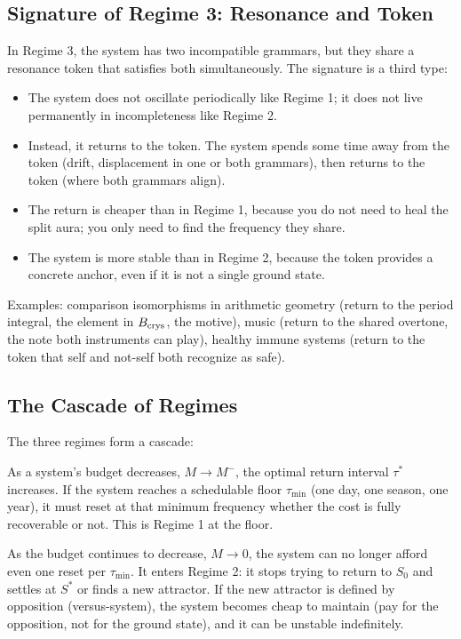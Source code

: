 \documentclass[12pt]{article}
\theoremstyle{definition}
\theoremstyle{remark}
\begin{document}
\subsection{Signature of Regime 3: Resonance and Token}

In Regime 3, the system has two incompatible grammars, but they share a resonance token that satisfies both simultaneously. The signature is a third type:

\begin{itemize}
\item The system does not oscillate periodically like Regime 1; it does not live permanently in incompleteness like Regime 2.
\item Instead, it returns to the token. The system spends some time away from the token (drift, displacement in one or both grammars), then returns to the token (where both grammars align).
\item The return is cheaper than in Regime 1, because you do not need to heal the split aura; you only need to find the frequency they share.
\item The system is more stable than in Regime 2, because the token provides a concrete anchor, even if it is not a single ground state.
\end{itemize}

Examples: comparison isomorphisms in arithmetic geometry (return to the period integral, the element in $B_{\rm crys}$, the motive), music (return to the shared overtone, the note both instruments can play), healthy immune systems (return to the token that self and not-self both recognize as safe).

\subsection{The Cascade of Regimes}

The three regimes form a cascade:

As a system's budget decreases, $M\to M^-$, the optimal return interval $\tau^*$ increases. If the system reaches a schedulable floor $\tau_{\min}$ (one day, one season, one year), it must reset at that minimum frequency whether the cost is fully recoverable or not. This is Regime 1 at the floor.

As the budget continues to decrease, $M\to 0$, the system can no longer afford even one reset per $\tau_{\min}$. It enters Regime 2: it stops trying to return to $S_0$ and settles at $S^*$ or finds a new attractor. If the new attractor is defined by opposition (versus-system), the system becomes cheap to maintain (pay for the opposition, not for the ground state), and it can be unstable indefinitely.
\end{document}
